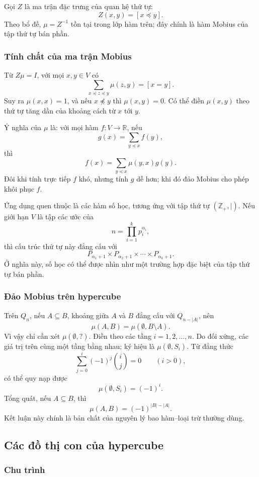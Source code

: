 \documentclass[11pt]{article}
\begin{document}
Gọi \(Z\) là ma trận đặc trưng của quan hệ thứ tự:
\[
  Z(x,y)=[x\preceq y].
\]
Theo bổ đề, \(\mu=Z^{-1}\) tồn tại trong lớp hàm trên; đây chính là hàm Mobius
của tập thứ tự bán phần.

\subsubsection{Tính chất của ma trận Mobius}

Từ \(Z\mu=I\), với mọi \(x,y\in V\) có
\[
  \sum_{x\preceq z\preceq y} \mu(z,y)=[x=y].
\]
Suy ra \(\mu(x,x)=1\), và nếu \(x\not\preceq y\) thì
\(\mu(x,y)=0\). Có thể điền \(\mu(x,y)\) theo thứ tự tăng dần của khoảng cách
từ \(x\) tới \(y\).

Ý nghĩa của \(\mu\) là: với mọi hàm \(f:V\to\mathbb R\), nếu
\[
  g(x)=\sum_{y\preceq x} f(y),
\]
thì
\[
  f(x)=\sum_{y\preceq x}\mu(y,x)g(y).
\]
Đôi khi tính trực tiếp \(f\) khó, nhưng tính \(g\) dễ hơn; khi đó đảo Mobius
cho phép khôi phục \(f\).

Ứng dụng quen thuộc là các hàm số học, tương ứng với tập thứ tự
\((\mathbb Z_+,\mid)\). Nếu giới hạn \(V\) là tập các ước của
\[
  n=\prod_{i=1}^k p_i^{\alpha_i},
\]
thì cấu trúc thứ tự này đẳng cấu với
\[
  P_{\alpha_1+1}\times P_{\alpha_2+1}\times\cdots\times P_{\alpha_k+1}.
\]
Ở nghĩa này, số học có thể được nhìn như một trường hợp đặc biệt của tập thứ
tự bán phần.

\subsubsection{Đảo Mobius trên hypercube}

Trên \(Q_n\), nếu \(A\subseteq B\), khoảng giữa \(A\) và \(B\) đẳng cấu với
\(Q_{n-|A|}\), nên
\[
  \mu(A,B)=\mu(\emptyset,B\setminus A).
\]
Vì vậy chỉ cần xét \(\mu(\emptyset, ?)\). Điền theo các tầng
\(i=1,2,\ldots,n\). Do đối xứng, các giá trị trên cùng một tầng bằng nhau; ký
hiệu là \(\mu(\emptyset,S_i)\). Từ đẳng thức
\[
  \sum_{j=0}^i (-1)^j\binom ij=0\qquad (i>0),
\]
có thể quy nạp được
\[
  \mu(\emptyset,S_i)=(-1)^i.
\]
Tổng quát, nếu \(A\subseteq B\), thì
\[
  \mu(A,B)=(-1)^{|B|-|A|}.
\]
Kết luận này chính là bản chất của nguyên lý bao hàm--loại trừ thường dùng.

\subsection{Các đồ thị con của hypercube}

\subsubsection{Chu trình}
\end{document}
